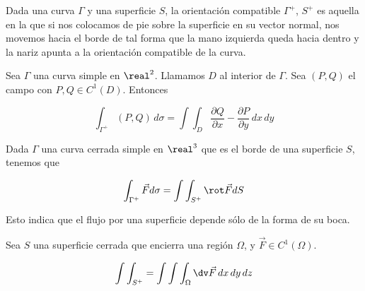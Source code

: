 \documentclass[12pt,a4paper,titlepage]{apuntes}
\begin{document}
\begin{defn}
Dada una curva $\Gamma$ y una superficie $S$, la orientación compatible $\Gamma^+$, $S^+$ es aquella en la que si nos colocamos de pie sobre la superficie en su vector normal, nos movemos hacia el borde de tal forma que la mano izquierda queda hacia dentro y la nariz apunta a la orientación compatible de la curva.\end{defn}


\begin{theorem}
Sea $\Gamma$ una curva simple en $\real^2$. Llamamos $D$ al interior de $\Gamma$. Sea $(P,Q)$ el campo con $P,Q\in C^1(D)$. Entonces

\[ \int_{\Gamma^+} (P,Q)\,d\sigma = \int\int_D \frac{\partial Q}{\partial x}-\frac{\partial P}{\partial y}\,dx\,dy\]
\end{theorem}

\begin{theorem}
Dada $\Gamma$ una curva cerrada simple en $\real^3$ que es el borde de una superficie $S$, tenemos que 

\[ \int_{\Gamma^+}\vec{F}d\sigma =\int\int_{S^+}\rot \vec{F}dS \]

Esto indica que el flujo por una superficie depende sólo de la forma de su boca.
\end{theorem}

\begin{theorem}
Sea $S$ una superficie cerrada que encierra una región $\Omega$, y $\vec{F}\in C^1(\Omega)$.

\[ \int\int_{S^+} = \int\int\int_\Omega \dv \vec{F}\, dx\, dy\, dz \]
\end{theorem}

\printindex
\end{document}
